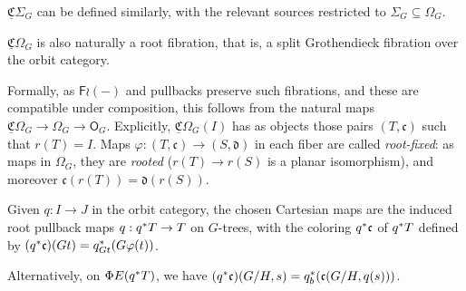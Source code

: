 \documentclass[a4paper,10pt
]{article}%
\renewcommand{\phi}{\varphi}
\newcommand{\UC}{\underline{\mathfrak C}}
\renewcommand{\1}{\ensuremath{\mathbb{id}}}
\begin{document}
\begin{remark}
{        $\UC \Sigma_G$ can be defined similarly, with the relevant sources restricted to
        $\Sigma_G \subseteq \Omega_G$. 
      }
\end{remark}


\begin{remark}
      $\underline{\mathfrak C}\Omega_G$ is also naturally a root fibration, 
      that is, a split Grothendieck fibration over the orbit category.

      Formally, as $\mathsf F \wr (-)$ and pullbacks preserve such fibrations, and these are compatible under composition,
      this follows from the natural maps $\underline{\mathfrak C}\Omega_G \to \Omega_G \to \mathsf O_G$.
      Explicitly, $\underline{\mathfrak C}\Omega_G(I)$ has as objects those pairs $(T,\mathfrak c)$ such that
      $r(T) = I$. 
      Maps $\phi:(T,\mathfrak c) \to (S, \mathfrak d)$ in each fiber are called \textit{root-fixed}:
      as maps in $\Omega_G$, they are \textit{rooted} ($r(T) \to r(S)$ is a planar isomorphism),
      and moreover $\mathfrak c(r(T)) = \mathfrak d(r(S))$.
      
      Given $q: I \to J$ in the orbit category,
      the chosen Cartesian maps are the induced root pullback maps $q: q^{\**}T \to T$ on $G$-trees,
      with the coloring $q^{\**}\mathfrak c$ of $q^{\**}T$ defined by
      $(q^{\**}\mathfrak c)(G t) = q_{G t}^{\**}(G \phi(t))$.

      {\color{blue} %
        Alternatively, on $\Phi E(q^{\**} T)$, we have
        $(q^{\**}\mathfrak c)(G/H, s) = q_b^{\**}(\mathfrak c(G/H, q(s)))$.
      } %
\end{remark}
\end{document}

